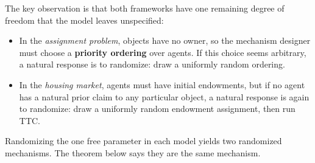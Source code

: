 \medskip
The key observation is that both frameworks have one remaining degree
of freedom that the model leaves unspecified:
\begin{itemize}
  \item In the \textit{assignment problem}, objects have no owner, so
  the mechanism designer must choose a \textbf{priority ordering} over
  agents. If this choice seems arbitrary, a natural response is to
  randomize: draw a uniformly random ordering.
  \item In the \textit{housing market}, agents must have initial
  endowments, but if no agent has a natural prior claim to any
  particular object, a natural response is again to randomize: draw a
  uniformly random endowment assignment, then run TTC.
\end{itemize}
Randomizing the one free parameter in each model yields two
randomized mechanisms. The theorem below says they are the same
mechanism.


